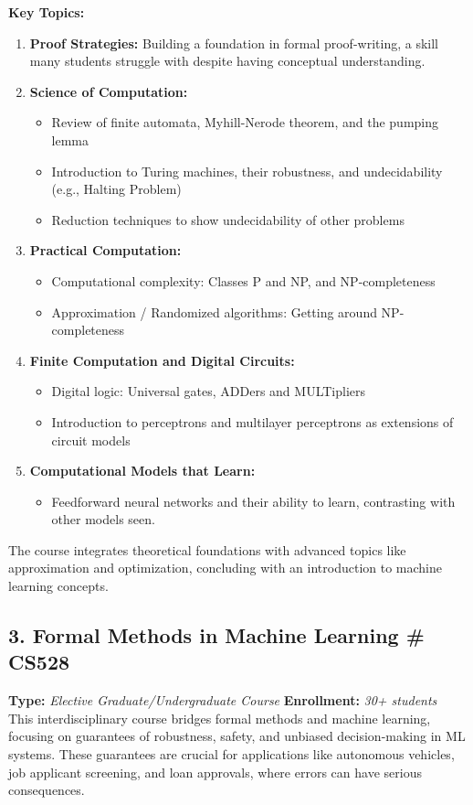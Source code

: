 \documentclass[11pt,a4paper,sans]{moderncv} %
\begin{document}
\textbf{Key Topics:}
\begin{enumerate}
    \item \textbf{Proof Strategies:} Building a foundation in formal proof-writing, a skill many students struggle with despite having conceptual understanding.
    \item \textbf{Science of Computation:}
    \begin{itemize}
        \item Review of finite automata, Myhill-Nerode theorem, and the pumping lemma
        \item Introduction to Turing machines, their robustness, and undecidability (e.g., Halting Problem)
        \item Reduction techniques to show undecidability of other problems
    \end{itemize}
    \item \textbf{Practical Computation:}
    \begin{itemize}
        \item Computational complexity: Classes P and NP, and NP-completeness
        \item Approximation / Randomized algorithms: Getting around NP-completeness
    \end{itemize}
    \item \textbf{Finite Computation and Digital Circuits:}
    \begin{itemize}
        \item Digital logic: Universal gates, ADDers and MULTipliers
        \item Introduction to perceptrons and multilayer perceptrons as extensions of circuit models
    \end{itemize}
    \item \textbf{Computational Models that Learn:}
    \begin{itemize}
        \item Feedforward neural networks and their ability to learn, contrasting with other models seen. \\
    \end{itemize}
\end{enumerate}

The course integrates theoretical foundations with advanced topics like approximation and optimization, concluding with an introduction to machine learning concepts.

\subsection*{3. Formal Methods in Machine Learning \null\hfill \# CS528}
\textbf{Type:} \emph{Elective Graduate/Undergraduate Course} \null\hfill \textbf{Enrollment:} \emph{30+ students} \\
This interdisciplinary course bridges formal methods and machine learning, focusing on guarantees of robustness, safety, and unbiased decision-making in ML systems. These guarantees are crucial for applications like autonomous vehicles, job applicant screening, and loan approvals, where errors can have serious consequences.
\end{document}

